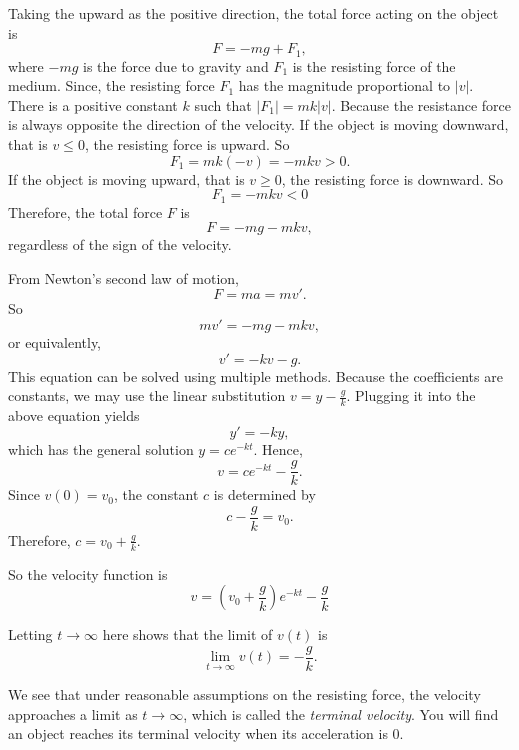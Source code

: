 \begin{solution}

Taking the upward as the positive direction, the total force acting on the object is
\[F=-mg+F_1,\]
where $-mg$ is the force due to gravity and $F_1$ is the resisting force of the medium. Since, the resisting force $F_1$ has the magnitude proportional to $|v|$. There is a positive constant $k$ such that $|F_1|=mk|v|$. Because the resistance force is always opposite the direction of the velocity.
If the object is moving downward, that is $v\le 0$, the resisting force is upward. So 
\[F_1=mk(-v)=-mkv>0.\]
If the object is moving upward, that is $v\ge 0$, the resisting force is downward. So
\[F_1=-mkv<0\]
Therefore, the total force $F$ is
\[F=-mg-mkv,\]
regardless of the sign of the velocity.

From Newton’s second law of motion,
\[F=ma=mv'.\]
So
\[mv'=-mg-mkv,\]
or equivalently,
\[v'=-kv-g.\]
This equation can be solved using multiple methods. Because the coefficients are constants, we may use the linear substitution $v=y-\frac{g}{k}$. Plugging it into the above equation yields
\[y'=-ky,\]
which has the general solution $y=ce^{-kt}$. Hence,
\[v=ce^{-kt}-\frac{g}{k}.\]
Since $v(0)=v_0$, the constant $c$ is determined by
\[c-\frac{g}{k}=v_0.\]
Therefore, $c=v_0+\frac{g}{k}$.

So the velocity function is
\[v=\left(v_0+\frac{g}{k}\right)e^{-kt}-\frac{g}{k}\]

Letting $t\to\infty$ here shows that the limit of $v(t)$ is
\[\lim_{t\to\infty} v(t)=-\frac{g}{k}.\]
\end{solution}

We see that under reasonable assumptions on the resisting force, the velocity approaches a limit as $t\to\infty$, which is called the \emph{terminal velocity}. You will find an object reaches its terminal velocity when its acceleration is $0$.

